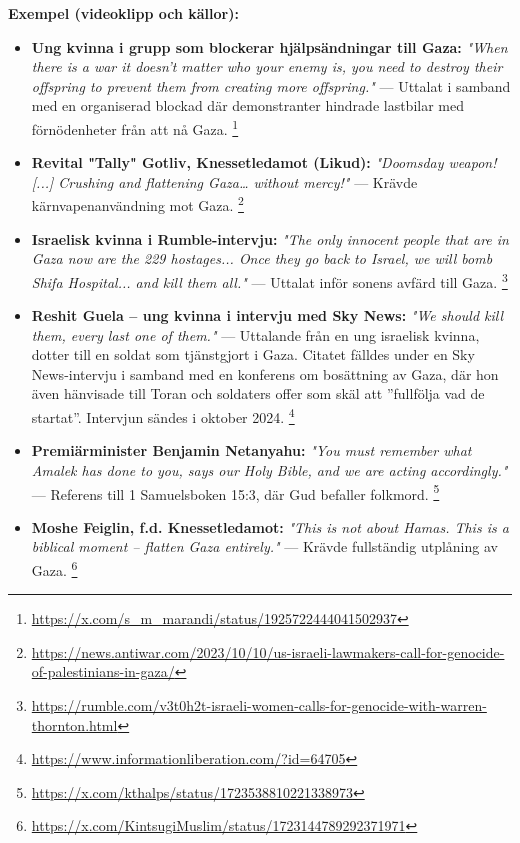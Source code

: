 \documentclass[12pt]{article}
\begin{document}
\vspace{1em}
\textbf{Exempel (videoklipp och källor):}
\begin{itemize}
    \item \textbf{Ung kvinna i grupp som blockerar hjälpsändningar till Gaza:} \textit{"When there is a war it doesn't matter who your enemy is, you need to destroy their offspring to prevent them from creating more offspring."} — Uttalat i samband med en organiserad blockad där demonstranter hindrade lastbilar med förnödenheter från att nå Gaza. \footnote{\url{https://x.com/s_m_marandi/status/1925722444041502937}}

    \item \textbf{Revital "Tally" Gotliv, Knessetledamot (Likud):} \textit{"Doomsday weapon! [...] Crushing and flattening Gaza… without mercy!"} — Krävde kärnvapenanvändning mot Gaza. \footnote{\url{https://news.antiwar.com/2023/10/10/us-israeli-lawmakers-call-for-genocide-of-palestinians-in-gaza/}}

    \item \textbf{Israelisk kvinna i Rumble-intervju:} \textit{"The only innocent people that are in Gaza now are the 229 hostages... Once they go back to Israel, we will bomb Shifa Hospital... and kill them all."} — Uttalat inför sonens avfärd till Gaza. \footnote{\url{https://rumble.com/v3t0h2t-israeli-women-calls-for-genocide-with-warren-thornton.html}}

\item \textbf{Reshit Guela – ung kvinna i intervju med Sky News:} \textit{"We should kill them, every last one of them."} — Uttalande från en ung israelisk kvinna, dotter till en soldat som tjänstgjort i Gaza. Citatet fälldes under en Sky News-intervju i samband med en konferens om bosättning av Gaza, där hon även hänvisade till Toran och soldaters offer som skäl att ”fullfölja vad de startat”. Intervjun sändes i oktober 2024. \footnote{\url{https://www.informationliberation.com/?id=64705}}


    \item \textbf{Premiärminister Benjamin Netanyahu:} \textit{"You must remember what Amalek has done to you, says our Holy Bible, and we are acting accordingly."} — Referens till 1 Samuelsboken 15:3, där Gud befaller folkmord. \footnote{\url{https://x.com/kthalps/status/1723538810221338973}}

    \item \textbf{Moshe Feiglin, f.d. Knessetledamot:} \textit{"This is not about Hamas. This is a biblical moment – flatten Gaza entirely."} — Krävde fullständig utplåning av Gaza. \footnote{\url{https://x.com/KintsugiMuslim/status/1723144789292371971}}


\end{itemize}
\end{document}
